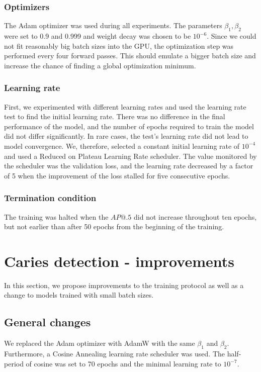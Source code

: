 \subsubsection{Optimizers}
The Adam optimizer was used during all experiments. The parameters $\beta_1, \beta_2$ were set to 0.9 and 0.999 and weight decay was chosen to be $10^{-6}$. Since we could not fit reasonably big batch sizes into the GPU, the optimization step was performed every four forward passes. This should emulate a bigger batch size and increase the chance of finding a global optimization minimum.

\subsubsection{Learning rate}
First, we experimented with different learning rates and used the learning rate test to find the initial learning rate. There was no difference in the final performance of the model, and the number of epochs required to train the model did not differ significantly. In rare cases, the test's learning rate did not lead to model convergence. We, therefore, selected a constant initial learning rate of $10^{-4}$ and used a Reduced on Plateau Learning Rate scheduler. The value monitored by the scheduler was the validation loss, and the learning rate decreased by a factor of 5 when the improvement of the loss stalled for five consecutive epochs.
\subsubsection{Termination condition}
The training was halted when the $AP@.5$ did not increase throughout ten epochs, but not earlier than after 50 epochs from the beginning of the training.

\section{Caries detection - improvements}
\label{sec:methods:improvements}
In this section, we propose improvements to the training protocol as well as a change to models trained with small batch sizes.
\subsection{General changes}
\label{sec:general_changes}
We replaced the Adam optimizer with AdamW with the same $\beta_1$ and $\beta_2$. Furthermore, a Cosine Annealing learning rate scheduler was used. The half-period of cosine was set to 70 epochs and the minimal learning rate to $10^{-7}$.

